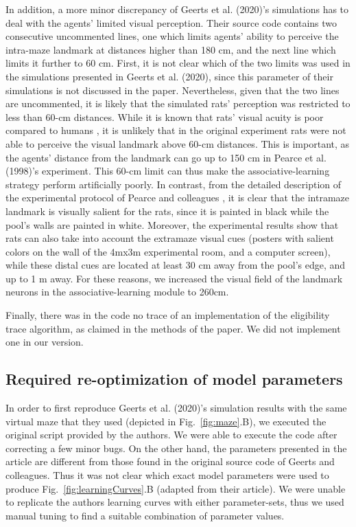 In addition, a more minor discrepancy of Geerts et al. (2020)'s simulations has to deal with the agents' limited visual perception. Their source code contains two consecutive uncommented lines, one which limits agents' ability to perceive the intra-maze landmark at distances higher than 180 cm, and the next line which limits it further to 60 cm. First, it is not clear which of the two limits was used in the simulations presented in Geerts et al. (2020), since this parameter of their simulations is not discussed in the paper. Nevertheless, given that the two lines are uncommented, it is likely that the simulated rats' perception was restricted to less than 60-cm distances. While it is known that rats' visual acuity is poor compared to humans \citep{caves2018}, it is unlikely that in the original experiment rats were not able to perceive the visual landmark above 60-cm distances. This is important, as the agents' distance from the landmark can go up to 150 cm in Pearce et al. (1998)'s experiment. This 60-cm limit can thus make the associative-learning strategy perform artificially poorly. In contrast, from the detailed description of the experimental protocol of Pearce and colleagues \citep{roberts1998}, it is clear that the intramaze landmark is visually salient for the rats, since it is painted in black while the pool's walls are painted in white. Moreover, the experimental results show that rats can also take into account the extramaze visual cues (posters with salient colors on the wall of the 4mx3m experimental room, and a computer screen), while these distal cues are located at least 30 cm away from the pool's edge, and up to 1 m away. For these reasons, we increased the visual field of the landmark neurons in the associative-learning module to 260cm.

Finally, there was in the code no trace of an implementation of the eligibility trace algorithm, as claimed in the methods of the paper. We did not implement one in our version.

\subsection{Required re-optimization of model parameters}
In order to first reproduce Geerts et al. (2020)'s simulation results \citep{Geerts:2020} with the same virtual maze that they used (depicted in Fig.~\ref{fig:maze}.B), we executed the original script provided by the authors. We were able to execute the code after correcting a few minor bugs. 
On the other hand, the parameters presented in the article are different from those found in the original source code of Geerts and colleagues. Thus it was not clear which exact model parameters were used to produce Fig.~\ref{fig:learningCurves}.B (adapted from their article). We were unable to replicate the authors learning curves with either parameter-sets, thus we used manual tuning to find a suitable combination of parameter values.

